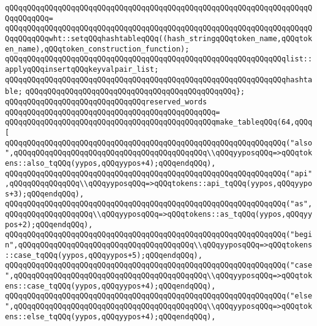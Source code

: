 \verb|qQQqqQQqqQQqqQQqqQQqqQQqqQQqqQQqqQQqqQQqqQQqqQQqqQQqqQQqqQQqqQQqqQQqqQQqqQQqqQQq=|\newline
\verb|qQQqqQQqqQQqqQQqqQQqqQQqqQQqqQQqqQQqqQQqqQQqqQQqqQQqqQQqqQQqqQQqqQQqqQQqqQQqqQQqwht::setqQQqhashtableqQQq((hash_stringqQQqtoken_name,qQQqtoken_name),qQQqtoken_construction_function);|\newline
\newline
\verb|qQQqqQQqqQQqqQQqqQQqqQQqqQQqqQQqqQQqqQQqqQQqqQQqqQQqqQQqqQQqqQQqlist::applyqQQqinsertqQQqkeyvalpair_list;|\newline
\verb|qQQqqQQqqQQqqQQqqQQqqQQqqQQqqQQqqQQqqQQqqQQqqQQqqQQqqQQqqQQqqQQqhashtable;|\newline
\verb|qQQqqQQqqQQqqQQqqQQqqQQqqQQqqQQqqQQqqQQqqQQqqQQq};|\newline
\newline
\verb|qQQqqQQqqQQqqQQqqQQqqQQqqQQqqQQqreserved_words|\newline
\verb|qQQqqQQqqQQqqQQqqQQqqQQqqQQqqQQqqQQqqQQqqQQqqQQq=|\newline
\verb|qQQqqQQqqQQqqQQqqQQqqQQqqQQqqQQqqQQqqQQqqQQqqQQqmake_tableqQQq(64,qQQq[|\newline
\verb|qQQqqQQqqQQqqQQqqQQqqQQqqQQqqQQqqQQqqQQqqQQqqQQqqQQqqQQqqQQqqQQq("also",qQQqqQQqqQQqqQQqqQQqqQQqqQQqqQQqqQQqqQQqqQQq\\qQQqyyposqQQq=>qQQqtokens::also_tqQQq(yypos,qQQqyypos+4);qQQqendqQQq),|\newline
\verb|qQQqqQQqqQQqqQQqqQQqqQQqqQQqqQQqqQQqqQQqqQQqqQQqqQQqqQQqqQQqqQQq("api",qQQqqQQqqQQqqQQq\\qQQqyyposqQQq=>qQQqtokens::api_tqQQq(yypos,qQQqyypos+3);qQQqendqQQq),|\newline
\verb|qQQqqQQqqQQqqQQqqQQqqQQqqQQqqQQqqQQqqQQqqQQqqQQqqQQqqQQqqQQqqQQq("as",qQQqqQQqqQQqqQQqqQQq\\qQQqyyposqQQq=>qQQqtokens::as_tqQQq(yypos,qQQqyypos+2);qQQqendqQQq),|\newline
\verb|qQQqqQQqqQQqqQQqqQQqqQQqqQQqqQQqqQQqqQQqqQQqqQQqqQQqqQQqqQQqqQQq("begin",qQQqqQQqqQQqqQQqqQQqqQQqqQQqqQQqqQQqqQQq\\qQQqyyposqQQq=>qQQqtokens::case_tqQQq(yypos,qQQqyypos+5);qQQqendqQQq),|\newline
\verb|qQQqqQQqqQQqqQQqqQQqqQQqqQQqqQQqqQQqqQQqqQQqqQQqqQQqqQQqqQQqqQQq("case",qQQqqQQqqQQqqQQqqQQqqQQqqQQqqQQqqQQqqQQqqQQq\\qQQqyyposqQQq=>qQQqtokens::case_tqQQq(yypos,qQQqyypos+4);qQQqendqQQq),|\newline
\verb|qQQqqQQqqQQqqQQqqQQqqQQqqQQqqQQqqQQqqQQqqQQqqQQqqQQqqQQqqQQqqQQq("else",qQQqqQQqqQQqqQQqqQQqqQQqqQQqqQQqqQQqqQQqqQQq\\qQQqyyposqQQq=>qQQqtokens::else_tqQQq(yypos,qQQqyypos+4);qQQqendqQQq),|\newline
